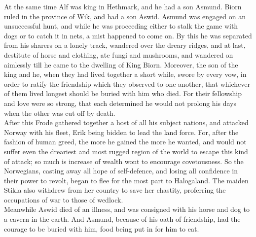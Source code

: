 \documentclass[10pt,a4paper]{report}
\begin{document}
At the same time Alf was king in Hethmark, and he had a son Asmund. Biorn ruled in the province of Wik, and had a son Aswid. Asmund was engaged on an unsuccessful hunt, and while he was proceeding either to stalk the game with dogs or to catch it in nets, a mist happened to come on. By this he was separated from his sharers on a lonely track, wandered over the dreary ridges, and at last, destitute of horse and clothing, ate fungi and mushrooms, and wandered on aimlessly till he came to the dwelling of King Biorn. Moreover, the son of the king and he, when they had lived together a short while, swore by every vow, in order to ratify the friendship which they observed to one another, that whichever of them lived longest should be buried with him who died. For their fellowship and love were so strong, that each determined he would not prolong his days when the other was cut off by death.\\

After this Frode gathered together a host of all his subject nations, and attacked Norway with his fleet, Erik being bidden to lead the land force. For, after the fashion of human greed, the more he gained the more he wanted, and would not suffer even the dreariest and most rugged region of the world to escape this kind of attack; so much is increase of wealth wont to encourage covetousness. So the Norwegians, casting away all hope of self-defence, and losing all confidence in their power to revolt, began to flee for the most part to Halogaland. The maiden Stikla also withdrew from her country to save her chastity, proferring the occupations of war to those of wedlock.\\

Meanwhile Aswid died of an illness, and was consigned with his horse and dog to a cavern in the earth. And Asmund, because of his oath of friendship, had the courage to be buried with him, food being put in for him to eat.\\
\end{document}
